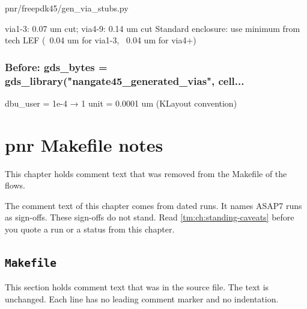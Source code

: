 \begin{relocated}{pnr/freepdk45/gen_via_stubs.py}
\begin{textblock}
via1-3: 0.07 um cut; via4-9: 0.14 um cut
Standard enclosure: use minimum from tech LEF (~0.04 um for via1-3, ~0.04 um for via4+)
\end{textblock}

\subsection*{Before: gds\_bytes = gds\_library("nangate45\_generated\_vias", cell...}

\begin{textblock}
dbu_user = 1e-4 → 1 unit = 0.0001 um (KLayout convention)
\end{textblock}

\end{relocated}

\chapter{pnr Makefile notes}\label{tm:ch:pd-makefile-notes}

This chapter holds comment text that was removed from the Makefile of the flows.

\begin{information}
The comment text of this chapter comes from dated runs. It names ASAP7 runs as sign-offs. These sign-offs do not stand. Read \cref{tm:ch:standing-caveats} before you quote a run or a status from this chapter.
\end{information}

\section{\texttt{Makefile}}\label{tm:pd:makefile}

This section holds comment text that was in the source file. The text is unchanged. Each line has no leading comment marker and no indentation.

